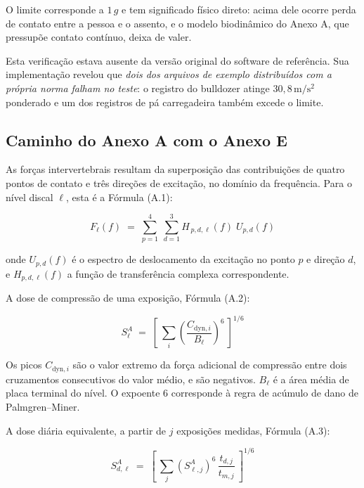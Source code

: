 \documentclass[11pt,a4paper]{article}
\newcommand{\unit}[2]{\ensuremath{#1\,\mathrm{#2}}}
\begin{document}
O limite corresponde a $1\,g$ e tem significado físico direto: acima dele
ocorre perda de contato entre a pessoa e o assento, e o modelo biodinâmico do
Anexo A, que pressupõe contato contínuo, deixa de valer.

Esta verificação estava ausente da versão original do software de referência.
Sua implementação revelou que \emph{dois dos arquivos de exemplo distribuídos
com a própria norma falham no teste}: o registro do bulldozer atinge
\unit{30{,}8}{m/s^2} ponderado e um dos registros de pá carregadeira também
excede o limite.

\subsection{Caminho do Anexo A com o Anexo E}

As forças intervertebrais resultam da superposição das contribuições de quatro
pontos de contato e três direções de excitação, no domínio da frequência. Para o
nível discal $\ell$, esta é a Fórmula (A.1):

\begin{equation}
F_\ell(f) \;=\; \sum_{p=1}^{4}\ \sum_{d=1}^{3}
      H_{\,p,d,\ell}(f)\; U_{p,d}(f)
\label{eq:a1}
\end{equation}

\noindent
onde $U_{p,d}(f)$ é o espectro de deslocamento da excitação no ponto $p$ e
direção $d$, e $H_{p,d,\ell}(f)$ a função de transferência complexa
correspondente.

A dose de compressão de uma exposição, Fórmula (A.2):

\begin{equation}
S^{A}_\ell \;=\; \left[\ \sum_{i}
    \left(\frac{C_{\mathrm{dyn},i}}{B_\ell}\right)^{6}\ \right]^{1/6}
\label{eq:a2}
\end{equation}

\noindent
Os picos $C_{\mathrm{dyn},i}$ são o valor extremo da força adicional de
compressão entre dois cruzamentos consecutivos do valor médio, e são negativos.
$B_\ell$ é a área média de placa terminal do nível. O expoente 6 corresponde à
regra de acúmulo de dano de Palmgren--Miner.

A dose diária equivalente, a partir de $j$ exposições medidas, Fórmula (A.3):

\begin{equation}
S^{A}_{d,\ell} \;=\; \left[\ \sum_{j}
    \left(S^{A}_{\ell,j}\right)^{6}\, \frac{t_{d,j}}{t_{m,j}}\ \right]^{1/6}
\label{eq:a3}
\end{equation}
\end{document}
